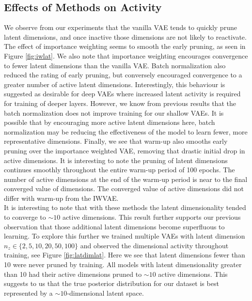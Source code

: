 \documentclass{article} %
\numberwithin{figure}{section}
\begin{document}
\subsection{Effects of Methods on Activity}
We observe from our experiments that the vanilla VAE tends to quickly prune latent dimensions, and once inactive those dimensions are not likely to reactivate. The effect of importance weighting seems to smooth the early pruning, as seen in Figure \ref{fig:iwlat}. We also note that importance weighting encourages convergence to fewer latent dimensions than the vanilla VAE. Batch normalization also reduced the rating of early pruning, but conversely encouraged convergence to a greater number of active latent dimensions. Interestingly, this behaviour is suggested as desirable for deep VAEs where increased latent activity is required for training of deeper layers. However, we know from previous results that the batch normalization does not improve training for our shallow VAEs. It is possible that by encouraging more active latent dimensions here, batch normalization may be reducing the effectiveness of the model to learn fewer, more representative dimensions. Finally, we see that warm-up also smooths early pruning over the importance weighted VAE, removing that drastic initial drop in active dimensions. It is interesting to note the pruning of latent dimensions continues smoothly throughout the entire warm-up period of 100 epochs. The number of active dimensions at the end of the warm-up period is near to the final converged value of dimensions. The converged value of active dimensions did not differ with warm-up from the IWVAE.\\
It is interesting to note that with these methods the latent dimensionality tended to converge to $\sim 10$ active dimensions. This result further supports our previous observation that those additional latent dimensions become superfluous to learning. To explore this further we trained multiple VAEs with latent dimension $n_z \in \{2,5,10,20,50,100\}$ and observed the dimensional activity throughout training, see Figure \ref{fig:latdimlat}. Here we see that latent dimensions fewer than 10 were never pruned by training. All models with latent dimensionality greater than 10 had their active dimensions pruned to $\sim 10$ active dimensions. This suggests to us that the true posterior distribution for our dataset is best represented by a $\sim 10$-dimensional latent space. 
 
\end{document}
